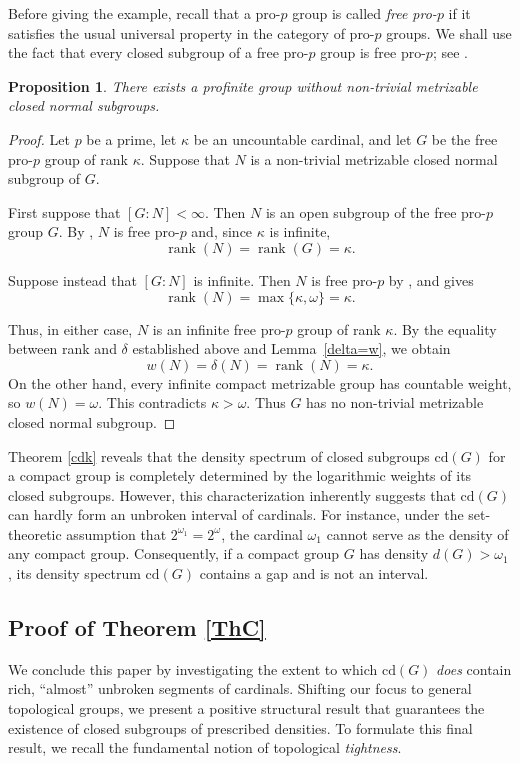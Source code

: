 \documentclass[12pt]{amsart}
\newtheorem{proposition}[theorem]{Proposition}
\theoremstyle{definition}
\numberwithin{equation}{section}
\theoremstyle{remark}
\def\cd{\mathrm{cd}}
\begin{document}
Before giving the example, recall that a pro-$p$ group is called \emph{free pro-$p$} if it satisfies the usual universal property in the category of pro-$p$ groups. We shall use the fact that every closed subgroup of a free pro-$p$ group is free pro-$p$; see \cite[Corollary~7.7.5]{RZ}.


\begin{proposition}\label{prop_free_prop}
There exists a profinite group without non-trivial metrizable closed normal subgroups.
\end{proposition}

\begin{proof}
Let $p$ be a prime, let $\kappa$ be an uncountable cardinal, and let $G$ be the free pro-$p$ group of rank $\kappa$. Suppose that $N$ is a non-trivial metrizable closed normal subgroup of $G$.

First suppose that $[G:N]<\infty$. Then $N$ is an open subgroup of the free pro-$p$ group $G$. By \cite[Theorem~3.6.2]{RZ}, $N$ is free pro-$p$ and, since $\kappa$ is infinite,
\[
\operatorname{rank}(N)=\operatorname{rank}(G)=\kappa.
\]

Suppose instead that $[G:N]$ is infinite. Then $N$ is free pro-$p$ by \cite[Corollary~7.7.5]{RZ}, and \cite[Proposition~8.6.3]{RZ} gives
\[
\operatorname{rank}(N)=\max\{\kappa,\omega\}=\kappa.
\]

Thus, in either case, $N$ is an infinite free pro-$p$ group of rank $\kappa$. By the equality between rank and $\delta$ established above and Lemma~\ref{delta=w}, we obtain
\[
w(N)=\delta(N)=\operatorname{rank}(N)=\kappa.
\]
On the other hand, every infinite compact metrizable group has countable weight, so $w(N)=\omega$. This contradicts $\kappa>\omega$. Thus $G$ has no non-trivial metrizable closed normal subgroup.
\end{proof}

Theorem \ref{cdk} reveals that the density spectrum of closed subgroups $\cd(G)$ for a compact group is completely determined by the logarithmic weights of its closed subgroups. However, this characterization inherently suggests that $\cd(G)$ can hardly form an unbroken interval of cardinals. For instance, under the set-theoretic assumption that $2^{\omega_1} = 2^\omega$, the cardinal $\omega_1$ cannot serve as the density of any compact group. Consequently, if a compact group $G$ has density $d(G) > \omega_1$, its density spectrum $\cd(G)$ contains a gap and is not an interval.


\subsection{Proof of Theorem \ref{ThC}}
We conclude this paper by investigating the extent to which $\cd(G)$ \emph{does} contain rich, ``almost'' unbroken segments of cardinals. Shifting our focus to general topological groups, we present a positive structural result that guarantees the existence of closed subgroups of prescribed densities. To formulate this final result, we recall the fundamental notion of topological \emph{tightness}. 
\end{document}
